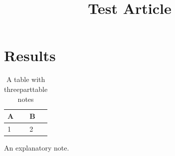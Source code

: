 \documentclass{ccr}
\title{Test Article}
\begin{document}
\maketitle

\section{Results}

\begin{table}[h]
\centering
\caption{A table with threeparttable notes}
\begin{threeparttable}
\begin{tabular}{ll}
\hline
A & B\tnote{*} \\
\hline
1 & 2 \\
\hline
\end{tabular}
\begin{tablenotes}[flushleft]
\footnotesize
\item[*] An explanatory note.
\end{tablenotes}
\end{threeparttable}
\end{table}

\printbibliography
\end{document}
